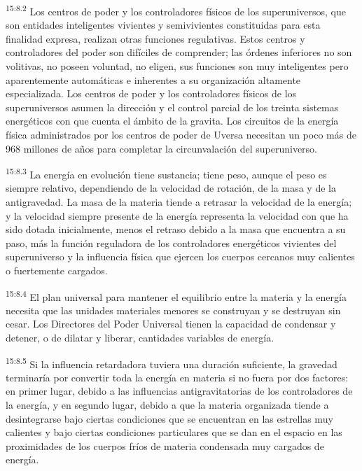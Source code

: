 \par
\textsuperscript{15:8.2} Los centros de poder y los controladores físicos de los superuniversos, que son entidades inteligentes vivientes y semivivientes constituidas para esta finalidad expresa, realizan otras funciones regulativas. Estos centros y controladores del poder son difíciles de comprender; las órdenes inferiores no son volitivas, no poseen voluntad, no eligen, sus funciones son muy inteligentes pero aparentemente automáticas e inherentes a su organización altamente especializada. Los centros de poder y los controladores físicos de los superuniversos asumen la dirección y el control parcial de los treinta sistemas energéticos con que cuenta el ámbito de la gravita. Los circuitos de la energía física administrados por los centros de poder de Uversa necesitan un poco más de 968 millones de años para completar la circunvalación del superuniverso.

\par
\textsuperscript{15:8.3} La energía en evolución tiene sustancia; tiene peso, aunque el peso es siempre relativo, dependiendo de la velocidad de rotación, de la masa y de la antigravedad. La masa de la materia tiende a retrasar la velocidad de la energía; y la velocidad siempre presente de la energía representa la velocidad con que ha sido dotada inicialmente, menos el retraso debido a la masa que encuentra a su paso, más la función reguladora de los controladores energéticos vivientes del superuniverso y la influencia física que ejercen los cuerpos cercanos muy calientes o fuertemente cargados.

\par
\textsuperscript{15:8.4} El plan universal para mantener el equilibrio entre la materia y la energía necesita que las unidades materiales menores se construyan y se destruyan sin cesar. Los Directores del Poder Universal tienen la capacidad de condensar y detener, o de dilatar y liberar, cantidades variables de energía.

\par
\textsuperscript{15:8.5} Si la influencia retardadora tuviera una duración suficiente, la gravedad terminaría por convertir toda la energía en materia si no fuera por dos factores: en primer lugar, debido a las influencias antigravitatorias de los controladores de la energía, y en segundo lugar, debido a que la materia organizada tiende a desintegrarse bajo ciertas condiciones que se encuentran en las estrellas muy calientes y bajo ciertas condiciones particulares que se dan en el espacio en las proximidades de los cuerpos fríos de materia condensada muy cargados de energía.

